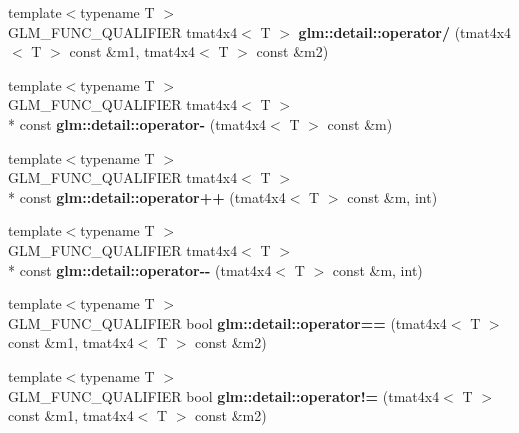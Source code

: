\begin{DoxyCompactItemize}
\item 
\hypertarget{namespaceglm_1_1detail_aef28094878813f4a07e17ab4b9e76272}{{\footnotesize template$<$typename T $>$ }\\G\-L\-M\-\_\-\-F\-U\-N\-C\-\_\-\-Q\-U\-A\-L\-I\-F\-I\-E\-R tmat4x4$<$ T $>$ {\bfseries glm\-::detail\-::operator/} (tmat4x4$<$ T $>$ const \&m1, tmat4x4$<$ T $>$ const \&m2)}\label{namespaceglm_1_1detail_aef28094878813f4a07e17ab4b9e76272}

\item 
\hypertarget{namespaceglm_1_1detail_af5e7bbe52d8f7c5cb5a317b616cdaf2c}{{\footnotesize template$<$typename T $>$ }\\G\-L\-M\-\_\-\-F\-U\-N\-C\-\_\-\-Q\-U\-A\-L\-I\-F\-I\-E\-R tmat4x4$<$ T $>$\\*
 const {\bfseries glm\-::detail\-::operator-\/} (tmat4x4$<$ T $>$ const \&m)}\label{namespaceglm_1_1detail_af5e7bbe52d8f7c5cb5a317b616cdaf2c}

\item 
\hypertarget{namespaceglm_1_1detail_aa5e18871374b599d72761351699cd204}{{\footnotesize template$<$typename T $>$ }\\G\-L\-M\-\_\-\-F\-U\-N\-C\-\_\-\-Q\-U\-A\-L\-I\-F\-I\-E\-R tmat4x4$<$ T $>$\\*
 const {\bfseries glm\-::detail\-::operator++} (tmat4x4$<$ T $>$ const \&m, int)}\label{namespaceglm_1_1detail_aa5e18871374b599d72761351699cd204}

\item 
\hypertarget{namespaceglm_1_1detail_af0e5b1193ec997b1c8f366521b727e25}{{\footnotesize template$<$typename T $>$ }\\G\-L\-M\-\_\-\-F\-U\-N\-C\-\_\-\-Q\-U\-A\-L\-I\-F\-I\-E\-R tmat4x4$<$ T $>$\\*
 const {\bfseries glm\-::detail\-::operator-\/-\/} (tmat4x4$<$ T $>$ const \&m, int)}\label{namespaceglm_1_1detail_af0e5b1193ec997b1c8f366521b727e25}

\item 
\hypertarget{namespaceglm_1_1detail_a3c172feec00f7d940e4acea842841699}{{\footnotesize template$<$typename T $>$ }\\G\-L\-M\-\_\-\-F\-U\-N\-C\-\_\-\-Q\-U\-A\-L\-I\-F\-I\-E\-R bool {\bfseries glm\-::detail\-::operator==} (tmat4x4$<$ T $>$ const \&m1, tmat4x4$<$ T $>$ const \&m2)}\label{namespaceglm_1_1detail_a3c172feec00f7d940e4acea842841699}

\item 
\hypertarget{namespaceglm_1_1detail_abb049d564233df24dda4531d2a1e2ad3}{{\footnotesize template$<$typename T $>$ }\\G\-L\-M\-\_\-\-F\-U\-N\-C\-\_\-\-Q\-U\-A\-L\-I\-F\-I\-E\-R bool {\bfseries glm\-::detail\-::operator!=} (tmat4x4$<$ T $>$ const \&m1, tmat4x4$<$ T $>$ const \&m2)}\label{namespaceglm_1_1detail_abb049d564233df24dda4531d2a1e2ad3}

\end{DoxyCompactItemize}


